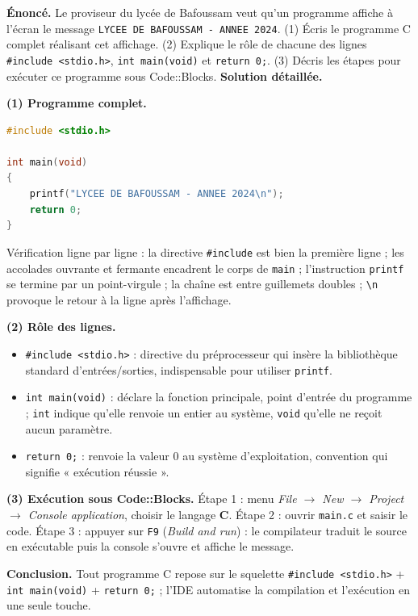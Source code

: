 \documentclass[11pt]{article}
\newcommand{\cle}[1]{{\popxbold\color{popdark}#1}}
\begin{document}
\begin{exoresolu}
\textbf{Énoncé.} Le proviseur du lycée de Bafoussam veut qu'un programme affiche à l'écran le message \texttt{LYCEE DE BAFOUSSAM - ANNEE 2024}. (1) Écris le programme C complet réalisant cet affichage. (2) Explique le rôle de chacune des lignes \texttt{\#include <stdio.h>}, \texttt{int main(void)} et \texttt{return 0;}. (3) Décris les étapes pour exécuter ce programme sous Code::Blocks.
\tcblower
\textbf{Solution détaillée.}

\textbf{(1) Programme complet.}
\begin{lstlisting}[language=C]
#include <stdio.h>

int main(void)
{
    printf("LYCEE DE BAFOUSSAM - ANNEE 2024\n");
    return 0;
}
\end{lstlisting}
Vérification ligne par ligne : la directive \texttt{\#include} est bien la première ligne ; les accolades ouvrante et fermante encadrent le corps de \texttt{main} ; l'instruction \texttt{printf} se termine par un point-virgule ; la chaîne est entre guillemets doubles ; \texttt{\textbackslash n} provoque le retour à la ligne après l'affichage.

\textbf{(2) Rôle des lignes.}
\begin{itemize}
\item \texttt{\#include <stdio.h>} : directive du préprocesseur qui insère la bibliothèque standard d'entrées/sorties, indispensable pour utiliser \texttt{printf}.
\item \texttt{int main(void)} : déclare la \cle{fonction principale}, point d'entrée du programme ; \texttt{int} indique qu'elle renvoie un entier au système, \texttt{void} qu'elle ne reçoit aucun paramètre.
\item \texttt{return 0;} : renvoie la valeur $0$ au système d'exploitation, convention qui signifie « exécution réussie ».
\end{itemize}

\textbf{(3) Exécution sous Code::Blocks.} Étape 1 : menu \emph{File $\to$ New $\to$ Project $\to$ Console application}, choisir le langage \textbf{C}. Étape 2 : ouvrir \texttt{main.c} et saisir le code. Étape 3 : appuyer sur \texttt{F9} (\emph{Build and run}) : le compilateur traduit le source en exécutable puis la console s'ouvre et affiche le message.

\textbf{Conclusion.} Tout programme C repose sur le squelette \texttt{\#include <stdio.h>} + \texttt{int main(void)} + \texttt{return 0;} ; l'IDE automatise la compilation et l'exécution en une seule touche.
\end{exoresolu}
\end{document}
